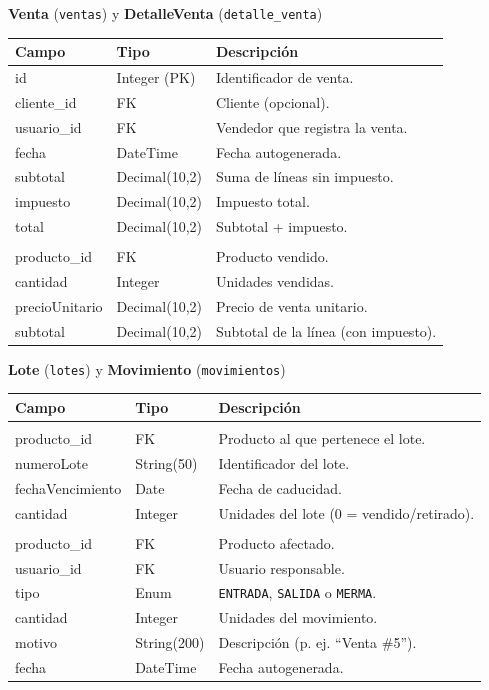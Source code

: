 \documentclass[11pt,a4paper]{article}
\begin{document}
\textbf{Venta} (\texttt{ventas}) y \textbf{DetalleVenta} (\texttt{detalle\_venta})
\begin{longtable}{>{\ttfamily}p{3.2cm} p{3.5cm} p{7cm}}
\toprule
\textbf{\normalfont Campo} & \textbf{\normalfont Tipo} & \textbf{\normalfont Descripción} \\
\midrule
\endhead
id & Integer (PK) & Identificador de venta. \\
cliente\_id & FK & Cliente (opcional). \\
usuario\_id & FK & Vendedor que registra la venta. \\
fecha & DateTime & Fecha autogenerada. \\
subtotal & Decimal(10,2) & Suma de líneas sin impuesto. \\
impuesto & Decimal(10,2) & Impuesto total. \\
total & Decimal(10,2) & Subtotal + impuesto. \\
\midrule
\multicolumn{3}{l}{\textit{DetalleVenta}} \\
\midrule
producto\_id & FK & Producto vendido. \\
cantidad & Integer & Unidades vendidas. \\
precioUnitario & Decimal(10,2) & Precio de venta unitario. \\
subtotal & Decimal(10,2) & Subtotal de la línea (con impuesto). \\
\bottomrule
\end{longtable}

\textbf{Lote} (\texttt{lotes}) y \textbf{Movimiento} (\texttt{movimientos})
\begin{longtable}{>{\ttfamily}p{3.2cm} p{3.5cm} p{7cm}}
\toprule
\textbf{\normalfont Campo} & \textbf{\normalfont Tipo} & \textbf{\normalfont Descripción} \\
\midrule
\endhead
\multicolumn{3}{l}{\textit{Lote}} \\
\midrule
producto\_id & FK & Producto al que pertenece el lote. \\
numeroLote & String(50) & Identificador del lote. \\
fechaVencimiento & Date & Fecha de caducidad. \\
cantidad & Integer & Unidades del lote (0 = vendido/retirado). \\
\midrule
\multicolumn{3}{l}{\textit{Movimiento}} \\
\midrule
producto\_id & FK & Producto afectado. \\
usuario\_id & FK & Usuario responsable. \\
tipo & Enum & \texttt{ENTRADA}, \texttt{SALIDA} o \texttt{MERMA}. \\
cantidad & Integer & Unidades del movimiento. \\
motivo & String(200) & Descripción (p. ej. ``Venta \#5''). \\
fecha & DateTime & Fecha autogenerada. \\
\bottomrule
\end{longtable}
\end{document}
